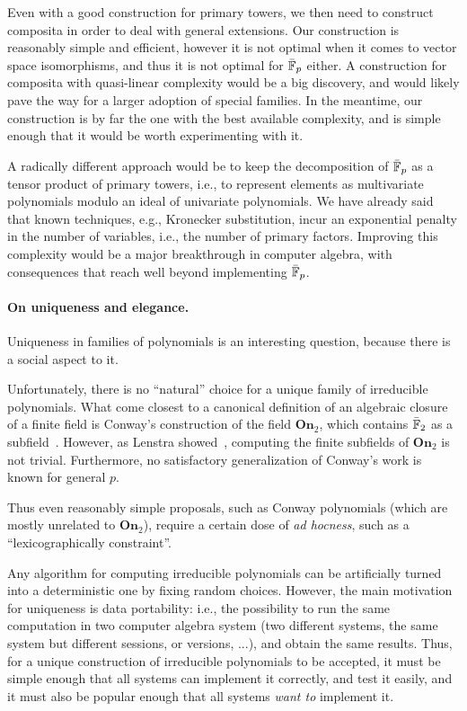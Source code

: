 \documentclass{report}
\theoremstyle{plain}
\theoremstyle{definition}
\begin{document}
Even with a good construction for primary towers, we then need to
construct composita in order to deal with general extensions. %
Our construction is reasonably simple and efficient, however it is not
optimal when it comes to vector space isomorphisms, and thus it is not
optimal for $\bar{\mathbb{F}}_p$ either. %
A construction for composita with quasi-linear complexity would be a
big discovery, and would likely pave the way for a larger adoption of
special families. %
In the meantime, our construction is by far the one with the best
available complexity, and is simple enough that it would be worth
experimenting with it. %

A radically different approach would be to keep the decomposition of
$\bar{\mathbb{F}}_p$ as a tensor product of primary towers, i.e., to represent
elements as multivariate polynomials modulo an ideal of univariate
polynomials. %
We have already said that known techniques, e.g., Kronecker
substitution, incur an exponential penalty in the number of variables,
i.e., the number of primary factors. %
Improving this complexity would be a major breakthrough in computer
algebra, with consequences that reach well beyond implementing
$\bar{\mathbb{F}}_p$.

\paragraph{On uniqueness and elegance.}
Uniqueness in families of polynomials is an interesting question,
because there is a social aspect to it. %

Unfortunately, there is no ``natural'' choice for a unique family of
irreducible polynomials. %
What come closest to a canonical definition of an algebraic closure of
a finite field is Conway's construction of the field $\mathbf{On}_2$,
which contains $\bar{\mathbb{F}}_2$ as a subfield~\cite{Conway:ONAG2000}. %
However, as Lenstra showed~\cite{LENSTRA1977389}, computing the finite
subfields of $\mathbf{On}_2$ is not trivial. %
Furthermore, no satisfactory generalization of Conway's work is known
for general $p$. %

Thus even reasonably simple proposals, such as Conway polynomials
(which are mostly unrelated to $\mathbf{On}_2$), require a certain
dose of \emph{ad hocness}, such as a ``lexicographically
constraint''. %

Any algorithm for computing irreducible polynomials can be
artificially turned into a deterministic one by fixing random
choices. %
However, the main motivation for uniqueness is data portability: i.e.,
the possibility to run the same computation in two computer algebra
system (two different systems, the same system but different sessions,
or versions, ...), and obtain the same results. %
Thus, for a unique construction of irreducible polynomials to be
accepted, it must be simple enough that all systems can implement it
correctly, and test it easily, and it must also be popular enough that
all systems \emph{want to} implement it. %
\end{document}
